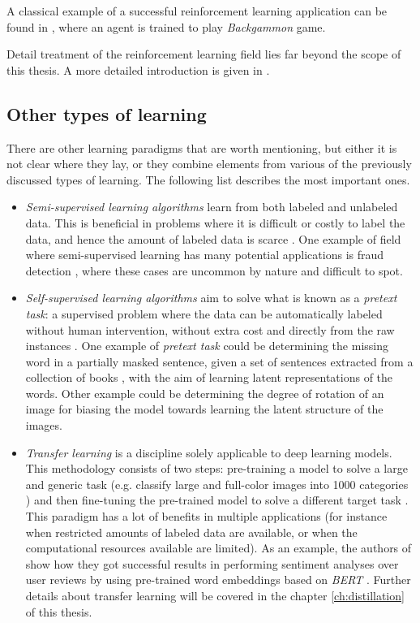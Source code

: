 A classical example of a successful reinforcement learning application can be found in \autocite{tesauro1994}, where an agent is trained to play \textit{Backgammon} game.

Detail treatment of the reinforcement learning field lies far beyond the scope of this thesis. A more detailed introduction is given in \autocite{sutton2018, szepesvari2010}.

\subsection{Other types of learning} \label{sec:typesoflearning_others}
There are other learning paradigms \autocite{raghu2020} that are worth mentioning, but either it is not clear where they lay, or they combine elements from various of the previously discussed types of learning. The following list describes the most important ones.
\begin{itemize}
	\item \textit{Semi-supervised learning algorithms} learn from both labeled and unlabeled data. This is beneficial in problems where it is difficult or costly to label the data, and hence the amount of labeled data is scarce \autocite{raghu2020}. One example of field where semi-supervised learning has many potential applications is fraud detection \autocite{wang2020b}, where these cases are uncommon by nature and difficult to spot.
	\item \textit{Self-supervised learning algorithms} aim to solve what is known as a \textit{pretext task}: a supervised problem where the data can be automatically labeled without human intervention, without extra cost and directly from the raw instances \autocite{raghu2020}. One example of \textit{pretext task} could be determining the missing word in a partially masked sentence, given a set of sentences extracted from a collection of books \autocite{devlin2019}, with the aim of learning latent representations of the words. Other example could be determining the degree of rotation of an image \autocite{gidaris2018} for biasing the model towards learning the latent structure of the images.
	\item \textit{Transfer learning} is a discipline solely applicable to deep learning models. This methodology consists of two steps: pre-training a model to solve a large and generic task (e.g. classify large and full-color images into 1000 categories \autocite{deng2009imagenet}) and then fine-tuning the pre-trained model to solve a different target task \autocite{raghu2020}. This paradigm has a lot of benefits in multiple applications (for instance when restricted amounts of labeled data are available, or when the computational resources available are limited). As an example, the authors of \autocite{souza2022} show how they got successful results in performing sentiment analyses over user reviews by using pre-trained word embeddings based on \textit{BERT} \autocite{devlin2019}. Further details about transfer learning will be covered in the chapter \ref{ch:distillation} of this thesis.
\end{itemize}


